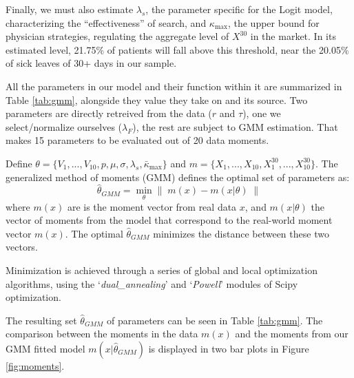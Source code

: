 \documentclass[../main.tex]{subfiles}
\begin{document}
Finally, we must also estimate $\lambda_s$, the parameter specific for the Logit model, characterizing the ``effectiveness'' of search, and $\kappa_{\max}$, the upper bound for physician strategies, regulating the aggregate level of $X^{30}$ in the market. In its estimated level, 21.75\% of patients will fall above this threshold, near the 20.05\% of sick leaves of 30+ days in our sample.

All the parameters in our model and their function within it are summarized in Table \ref{tab:gmm}, alongside they value they take on and its source. Two parameters are directly retreived from the data ($r$ and $\tau$), one we select/normalize ourselves ($\lambda_F$), the rest are subject to GMM estimation. That makes 15 parameters to be evaluated out of 20 data moments.

Define $\theta = \{V_1, ..., V_{10}, p, \mu, \sigma, \lambda_s, \bar{\kappa}_{\max}\}$ and $m = \{X_1, ..., X_{10}, X_1^{30}, ..., X_{10}^{30}\}$. The generalized method of moments (GMM) defines the optimal set of parameters as:
\begin{equation}
    \hat{\theta}_{GMM} = \min_{\theta} \left\| \; m(x) - m(x|\theta)\; \right\|
\end{equation}
where $m(x)$ are is the moment vector from real data $x$, and $m(x|\theta)$ the vector of moments from the model that correspond to the real-world moment vector $m(x)$. The optimal $\hat{\theta}_{GMM}$ minimizes the distance between these two vectors.

Minimization is achieved through a series of global and local optimization algorithms, using the `\textit{dual\_annealing}' and `\textit{Powell}' modules of Scipy optimization.


The resulting set $\hat{\theta}_{GMM}$ of parameters can be seen in Table \ref{tab:gmm}. The comparison between the moments in the data $m(x)$ and the moments from our GMM fitted model $m(x|\hat{\theta}_{GMM})$ is displayed in two bar plots in Figure \ref{fig:moments}.
\end{document}
